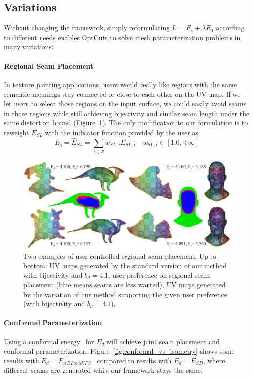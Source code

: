 \subsection{Variations}

Without changing the framework, simply reformulating $L = E_s + \lambda E_d$ according to different needs enables OptCuts to solve mesh parameterization problems in many variations:

\paragraph{Regional Seam Placement}
In texture painting applications, users would really like regions with the same semantic meanings stay connected or close to each other on the UV map. If we let users to select those regions on the input surface, we could easily avoid seams in those regions while still achieving bijectivity and similar seam length under the same distortion bound (Figure~\ref{fig:regional_seam_placement}). The only modification to our formulation is to reweight $E_{SL}$ with the indicator function provided by the user as
\[ E_s = \hat{E}_{SL} = \sum_{i\in\mathcal{S}} w_{SL,i} E_{SL,i} \quad w_{SL,i} \in [1.0, +\infty] \]

\begin{figure}[!h]
\centering
\includegraphics[width=\linewidth]{fig/regional_user.png}
\caption{Two examples of user controlled regional seam placement. Up to bottom: UV maps generated by the standard version of our method with bijectivity and $b_d = 4.1$, user preference on regional seam placement (blue means seams are less wanted), UV maps generated by the variation of our method supporting the given user preference (with bijectivity and $b_d = 4.1$).}
\label{fig:regional_seam_placement}
\end{figure}

\paragraph{Conformal Parameterization}
Using a conformal energy~\cite{Hormann2000MIPS,Sheffer2005ABFPP} for $E_d$ will achieve joint seam placement and conformal parameterization. Figure~\ref{fig:conformal_vs_isometry} shows some results with $E_d = E_{ABForMIPS}$~\cite{} compared to results with $E_d = E_{SD}$, where different seams are generated while our framework stays the same.

